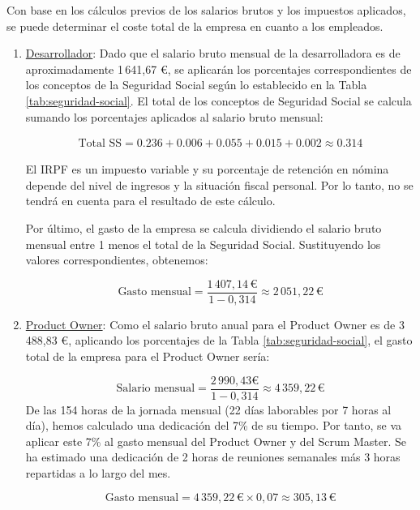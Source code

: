 \begin{enumerate}
    Con base en los cálculos previos de los salarios brutos y los impuestos aplicados, se puede determinar el coste total de la empresa en cuanto a los empleados. 
    
    \begin{enumerate}
        \item \underline{Desarrollador}: Dado que el salario bruto mensual de la desarrolladora es de aproximadamente 1\,641,67 €, se aplicarán los porcentajes correspondientes de los conceptos de la Seguridad Social según lo establecido en la Tabla \ref{tab:seguridad-social}. El total de los conceptos de Seguridad Social se calcula sumando los porcentajes aplicados al salario bruto mensual:

        \begin{align*}
        \text{Total SS} = 0.236 + 0.006 + 0.055 + 
         0.015 + 0.002 \approx 0.314
        \end{align*}
        
        El IRPF es un impuesto variable y su porcentaje de retención en nómina depende del nivel de ingresos y la situación fiscal personal. Por lo tanto, no se tendrá en cuenta para el resultado de este cálculo.
        
        Por último, el gasto de la empresa se calcula dividiendo el salario bruto mensual entre 1 menos el total de la Seguridad Social. Sustituyendo los valores correspondientes, obtenemos:
        
        \[
        \text{{Gasto mensual}} = \frac{{1\,407,14  \, \text{{€}}}}{{1 - 0,314 }} \approx 2\,051,22 \, \text{{€}}
        \]
        

        \item \underline{Product Owner}: Como el salario bruto anual para el Product Owner es de 3\,488,83 €, aplicando los porcentajes de la Tabla \ref{tab:seguridad-social}, el gasto total de la empresa para el Product Owner sería:

        \[
        \text{{Salario mensual}} = \frac{{2\,990,43  \text{{€}}}}{{1 - 0,314}} \approx 4\,359,22 \, \text{{€}}
        \]
        De las 154 horas de la jornada mensual (22 días laborables por 7 horas al día), hemos calculado una dedicación del 7\% de su tiempo. Por tanto, se va aplicar este 7\% al gasto mensual del Product Owner y del Scrum Master. Se ha estimado una dedicación de 2 horas de reuniones semanales más 3 horas repartidas a lo largo del mes.

        \[
        \text{{Gasto mensual}} = 4\,359,22 \, \text{{€}} \times 0,07 \approx 305,13 \,\text{{€}}
        \]


\end{enumerate}
\end{enumerate}
